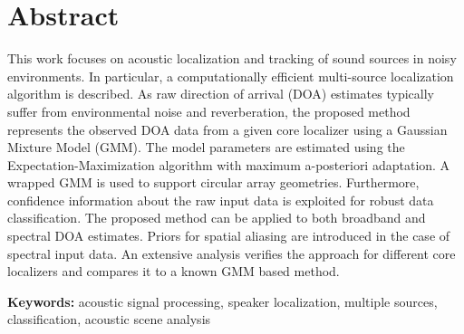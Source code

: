 \cleardoublepage
{}
\chapter*{Abstract}

This work focuses on acoustic localization and tracking of sound sources in noisy environments. In particular, a computationally efficient multi-source localization algorithm is described. As raw 
direction of arrival (DOA) estimates typically suffer from environmental noise and reverberation, the proposed method represents the observed DOA data from a given core localizer using a Gaussian Mixture Model (GMM). The model parameters are estimated using the Expectation-Maximization algorithm with maximum a-posteriori adaptation. A wrapped GMM is used to support circular array geometries. Furthermore, confidence information about the raw input data is exploited for robust data classification. The proposed method can be applied to both broadband and spectral DOA estimates. Priors for spatial aliasing are introduced in the case of spectral input data. An extensive analysis verifies the approach for different core localizers and compares it to a known GMM based method. 

\textbf{Keywords:} acoustic signal processing, speaker localization, multiple sources, classification, acoustic scene analysis

